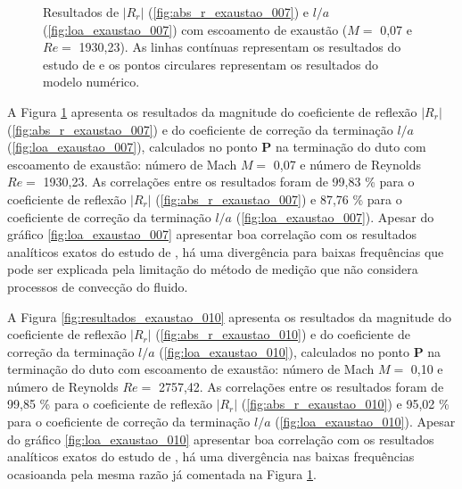 \newpage
\begin{figure}[ht!]
\begin{subfigure}{\scaleA \textwidth}
  
\end{subfigure}%
\begin{subfigure}{\scaleA \textwidth}
  
\end{subfigure}
\caption[Resultados de $|R_{r}|$ e $l/a$ com escoamento de exaustão ($M =$ 0,07 e $Re =$ 1930,23)]{Resultados de $|R_{r}|$ (\ref{fig:abs_r_exaustao_007}) e $l/a$ (\ref{fig:loa_exaustao_007}) com escoamento de exaustão ($M =$ 0,07 e $Re =$ 1930,23). As linhas contínuas representam os resultados do estudo de  e os pontos circulares representam os resultados do modelo numérico.}
\label{fig:resultados_exaustao_007}
\end{figure}

A Figura \ref{fig:resultados_exaustao_007} apresenta os resultados da magnitude do coeficiente de reflexão $|R_{r}|$ (\ref{fig:abs_r_exaustao_007}) e do coeficiente de correção da terminação $l/a$ (\ref{fig:loa_exaustao_007}), calculados no ponto $\textbf{P}$ na terminação do duto com escoamento de exaustão: número de Mach $M =$ 0,07 e número de Reynolds $Re =$ 1930,23.  As correlações entre os resultados foram de 99,83 \% para o coeficiente de reflexão $|R_{r}|$ (\ref{fig:abs_r_exaustao_007}) e 87,76 \% para o coeficiente de correção da terminação $l/a$ (\ref{fig:loa_exaustao_007}). Apesar do gráfico \ref{fig:loa_exaustao_007} apresentar boa correlação com os resultados analíticos exatos do estudo de , há uma divergência para baixas frequências que pode ser explicada pela limitação do método de medição que não considera processos de convecção do fluido.  

A Figura \ref{fig:resultados_exaustao_010} apresenta os resultados da magnitude do coeficiente de reflexão $|R_{r}|$ (\ref{fig:abs_r_exaustao_010}) e do coeficiente de correção da terminação $l/a$ (\ref{fig:loa_exaustao_010}), calculados no ponto $\textbf{P}$ na terminação do duto com escoamento de exaustão: número de Mach $M =$ 0,10 e número de Reynolds $Re =$ 2757,42.  As correlações entre os resultados foram de 99,85 \% para o coeficiente de reflexão $|R_{r}|$ (\ref{fig:abs_r_exaustao_010}) e 95,02 \% para o coeficiente de correção da terminação $l/a$ (\ref{fig:loa_exaustao_010}). Apesar do gráfico \ref{fig:loa_exaustao_010} apresentar boa correlação com os resultados analíticos exatos do estudo de , há uma divergência nas baixas frequências ocasioanda pela mesma razão já comentada na Figura \ref{fig:resultados_exaustao_007}.

